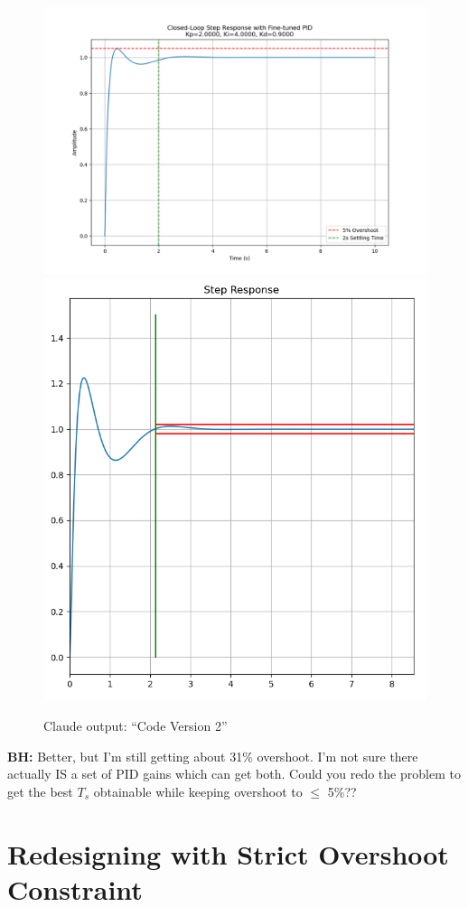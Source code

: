 \documentclass{article}
\begin{document}
\begin{figure}\centering
\includegraphics[height=0.35\textwidth]{figsapdx/M47G17cl.png}
\includegraphics[height=0.35\textwidth]{figsapdx/M47G17.png}
\caption{Claude output: ``Code Version 2''}
\end{figure}


\textbf{BH:}
Better, but I'm still getting about 31\% overshoot. I'm not sure there actually IS a set of PID gains which can get both. Could you redo the problem to get the best $T_s$ obtainable while keeping overshoot to $\leq$ 5\%??


\section*{Redesigning with Strict Overshoot Constraint}
\end{document}
